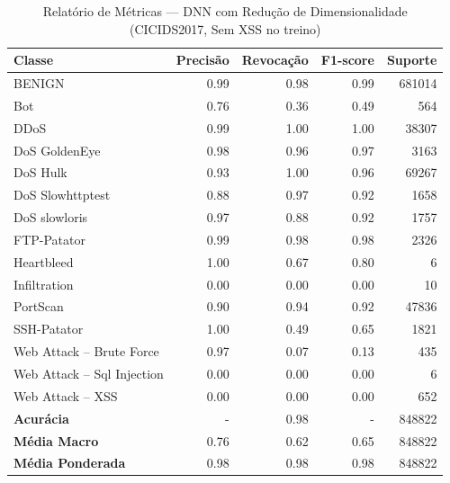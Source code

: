 \begin{table}[H]
    \centering
    \small
    \begin{tabular}{lrrrr}
        \hline
        Classe                     & Precisão & Revocação & F1-score & Suporte \\
        \hline
        BENIGN                     & 0.99     & 0.98      & 0.99     & 681014  \\
        Bot                        & 0.76     & 0.36      & 0.49     & 564     \\
        DDoS                       & 0.99     & 1.00      & 1.00     & 38307   \\
        DoS GoldenEye              & 0.98     & 0.96      & 0.97     & 3163    \\
        DoS Hulk                   & 0.93     & 1.00      & 0.96     & 69267   \\
        DoS Slowhttptest           & 0.88     & 0.97      & 0.92     & 1658    \\
        DoS slowloris              & 0.97     & 0.88      & 0.92     & 1757    \\
        FTP-Patator                & 0.99     & 0.98      & 0.98     & 2326    \\
        Heartbleed                 & 1.00     & 0.67      & 0.80     & 6       \\
        Infiltration               & 0.00     & 0.00      & 0.00     & 10      \\
        PortScan                   & 0.90     & 0.94      & 0.92     & 47836   \\
        SSH-Patator                & 1.00     & 0.49      & 0.65     & 1821    \\
        Web Attack – Brute Force   & 0.97     & 0.07      & 0.13     & 435     \\
        Web Attack – Sql Injection & 0.00     & 0.00      & 0.00     & 6       \\
        Web Attack – XSS           & 0.00     & 0.00      & 0.00     & 652     \\
        \hline
        \textbf{Acurácia}          & -        & 0.98      & -        & 848822  \\
        \textbf{Média Macro}       & 0.76     & 0.62      & 0.65     & 848822  \\
        \textbf{Média Ponderada}   & 0.98     & 0.98      & 0.98     & 848822  \\
        \hline
    \end{tabular}
    \caption{Relatório de Métricas — DNN com Redução de Dimensionalidade (CICIDS2017, Sem XSS no treino)}
    \label{table:dnn_cicids_reducao_sem_xss_metricas}
\end{table}
